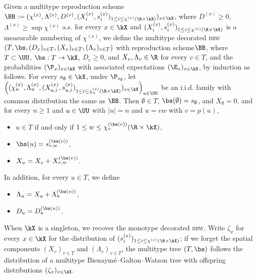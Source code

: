 \documentclass[10pt,a4paper]{article}
\newcommand{\brw}{\textsc{brw}\xspace}
\renewcommand{\kx}{s}
\newcommand{\repscheme}{reproduction scheme\xspace}
\begin{document}
Given a multitype \repscheme $\BB := (\chi^{(x)}, \Lambda^{(x)}, D^{(x)}, (X^{(x)}_i, \kx^{(x)}_i)_{1\leq i \leq \chi^{(x)}(\R\times\kX)})_{x\in\kX}$, where $D^{(x)}\geq 0$, $\Lambda^{(x)}\geq \sup\chi^{(x)}$ a.s. for every $x\in\kX$ and $(X^{(x)}_i, \kx^{(x)}_i)_{1\leq i \leq \chi^{(x)}(\R\times\kX)}$ is a measurable numbering of $\chi^{(x)}$, 
we define the multitype decorated \brw $(T, \bs, (D_v)_{v\in T}, (X_v)_{v\in T}, (\Lambda_v)_{v\in T})$ with \repscheme $\BB$, where $T\subset \UU$, $\bs:T\to\kX$, $D_v\geq 0$, and $X_v, \Lambda_v \in \R$ for every $v\in T$, and the probabilities $(\P_{x})_{x\in\kX}$ with associated expectations $(\E_x)_{x\in\kX}$, by induction as follows. 
For every $\kx_\emptyset\in\kX$, under $\P_{\kx_\emptyset}$, let $\left((\chi^{(x)}_u, \Lambda^{(x)}_u, (X^{(x)}_{u,i}, \kx^{(x)}_{u,i})_{1\leq i \leq \chi^{(x)}_u(\R\times\kX)})_{x\in\kX}\right)_{u\in \UU}$ be an i.i.d. family with common distribution the same as $\BB$. Then $\emptyset \in T$, $\bs(\emptyset) = \kx_\emptyset$, and $X_\emptyset = 0$, and for every $n\geq 1$ and $u\in\UU$ with $|u|=n$ and $u = vw$ with $v=p(u)$,  
\begin{itemize}
\item $u\in T$ if and only if $1\leq w \leq \chi^{(\bs(v))}_v(\R\times\kX)$,
\item $\bs(u) = \kx^{(\bs(v))}_{v, w}$, 
\item $X_u = X_v + X^{(\bs(v))}_{v,w}$. 
\end{itemize}
In addition, for every $u\in T$, we define
\begin{itemize}
\item $\Lambda_u = X_u + \Lambda^{(\bs(u))}_u$,
\item $D_u = D^{(\bs(u))}_u$. 
\end{itemize}
When $\kX$ is a singleton, we recover the monotype decorated \brw. %
Write $\zeta_x$ for every $x\in\kX$ for the distribution of $(\kx^{(x)}_i)_{1\leq i \leq \chi^{(x)}(\R\times \kX)}$; if we forget the spatial components $(X_v)_{v\in T}$ and $(\Lambda_v)_{v\in T}$, the multitype tree $(T,\bs)$ follows the distribution of a multitype Bienaymé--Galton--Watson tree with offspring distributions $(\zeta_x)_{x\in\kX}$. %
\end{document}

